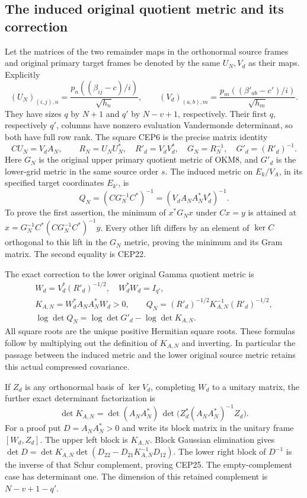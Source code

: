 \documentclass[11pt,a4paper]{article}
\begin{document}
\subsection{The induced original quotient metric and its correction}

Let the matrices of the two remainder maps in the orthonormal source
frames and original primary target frames be denoted by the same
$U_N,V_d$ as their maps. Explicitly
\[
 (U_N)_{(i,j),n}=\frac{p_n((\beta_{ij}-c)/i)}{\sqrt{h_n}},
 \qquad
 (V_d)_{(a,b),m}=\frac{p_m((\beta'_{ab}-c')/i)}{\sqrt{h_m}} .
 \tag{CEP21}
\]
They have sizes $q$ by $N+1$ and $q'$ by $N-v+1$,
respectively. Their first $q$, respectively $q'$, columns have
nonzero evaluation Vandermonde determinant, so both have full row
rank. The square CEP6 is the precise matrix identity
\[
 C U_N=V_dA_N,\qquad
 R_N=U_NU_N^*,\quad R'_d=V_dV_d^*,\quad
 G_N=R_N^{-1},\quad G'_d=(R'_d)^{-1}.
 \tag{CEP22}
\]
Here $G_N$ is the original upper primary quotient metric of OKM8,
and $G'_d$ is the lower-grid metric in the same source order $s$.
The induced metric on $E_k/V_A$, in its specified target coordinates
$E_{k'}$, is
\[
 Q_N=(C G_N^{-1}C^*)^{-1}
       =(V_dA_NA_N^*V_d^*)^{-1}.
 \tag{CEP23}
\]
To prove the first assertion, the minimum of $x^*G_Nx$ under
$Cx=y$ is attained at
$x=G_N^{-1}C^*(CG_N^{-1}C^*)^{-1}y$.
Every other lift differs by an element of $\ker C$ orthogonal
to this lift in the $G_N$ metric, proving the minimum and its
Gram matrix. The second equality is CEP22.

The exact correction to the lower original Gamma quotient metric is
\[
 \begin{gathered}
 W_d=V_d^*(R'_d)^{-1/2},\quad W_d^*W_d=I_{q'},\\
 K_{A,N}=W_d^*A_NA_N^*W_d>0,\qquad
 Q_N=(R'_d)^{-1/2}K_{A,N}^{-1}(R'_d)^{-1/2},\\
 \log\det Q_N=\log\det G'_d-\log\det K_{A,N}.
 \end{gathered}\tag{CEP24}
\]
All square roots are the unique positive Hermitian square roots.
These formulas follow by multiplying out the definition of
$K_{A,N}$ and inverting. In particular the passage between the
induced metric and the lower original source metric retains this
actual compressed covariance.

If $Z_d$ is any orthonormal basis of $\ker V_d$, completing $W_d$
to a unitary matrix, the further exact determinant factorization is
\[
 \det K_{A,N}
   =\det(A_NA_N^*)\,
        \det\bigl(Z_d^*(A_NA_N^*)^{-1}Z_d\bigr).
 \tag{CEP25}
\]
For a proof put $D=A_NA_N^*>0$ and write its block matrix in
the unitary frame $[W_d,Z_d]$. The upper left block is $K_{A,N}$.
Block Gaussian elimination gives
$\det D=\det K_{A,N}\det(D_{22}-D_{21}K_{A,N}^{-1}D_{12})$.
The lower right block of $D^{-1}$ is the inverse of that Schur
complement, proving CEP25. The empty-complement case has determinant
one. The dimension of this retained complement is
$N-v+1-q'$.
\end{document}
